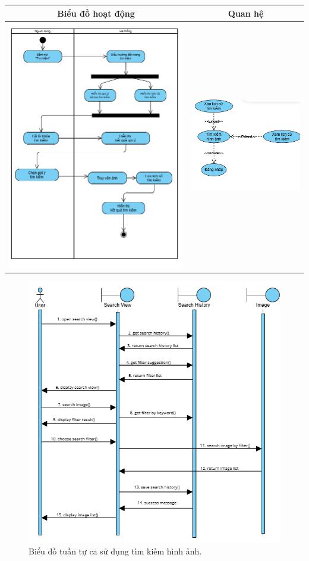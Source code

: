 \vspace{0.8cm}

\noindent 
\begin{tabular}{| c | c |}
    \hline
    \textbf{Biểu đồ hoạt động} & \textbf{Quan hệ} \\ 
    \hline
    \includegraphics[width=0.6\linewidth]{figures/c3/3-3-16-activity-diagram.png} 
    &  
    \includegraphics[width=0.35\linewidth]{figures/c3/3-3-16-relationship.png} \\ 
    \hline
\end{tabular}

\begin{figure}[H]
    \centering  
    \includegraphics[width=1\textwidth]{figures/c3/3-3-16-sequence-diagram.png}
    \caption{Biểu đồ tuần tự ca sử dụng tìm kiếm hình ảnh.}
    \label{fig:3-3-16-sequence-diagram}
\end{figure}